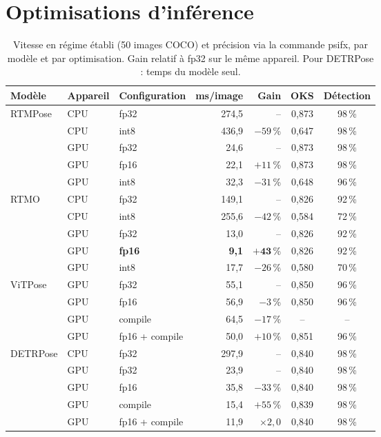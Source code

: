 \documentclass[11pt,a4paper]{report}
\begin{document}
\section{Optimisations d'inférence}
\label{sec:res-optim}

\begin{table}[H]
\centering
\caption{Vitesse en régime établi (50 images COCO) et précision via la commande psifx, par modèle et par
optimisation. Gain relatif à fp32 sur le même appareil. Pour DETRPose : temps du modèle seul.}
\label{tab:optim}
\small
\begin{tabular}{@{}lllrrcc@{}}
\toprule
Modèle & Appareil & Configuration & ms/image & Gain & OKS & Détection \\
\midrule
\multirow{5}{*}{RTMPose} & CPU & fp32 & 274,5 & -- & 0,873 & 98\,\% \\
& CPU & int8 & 436,9 & $-59$\,\% & 0,647 & 98\,\% \\
& GPU & fp32 & 24,6 & -- & 0,873 & 98\,\% \\
& GPU & fp16 & 22,1 & $+11$\,\% & 0,873 & 98\,\% \\
& GPU & int8 & 32,3 & $-31$\,\% & 0,648 & 96\,\% \\
\midrule
\multirow{5}{*}{RTMO} & CPU & fp32 & 149,1 & -- & 0,826 & 92\,\% \\
& CPU & int8 & 255,6 & $-42$\,\% & 0,584 & 72\,\% \\
& GPU & fp32 & 13,0 & -- & 0,826 & 92\,\% \\
& GPU & \textbf{fp16} & \textbf{9,1} & $\mathbf{+43}$\,\% & 0,826 & 92\,\% \\
& GPU & int8 & 17,7 & $-26$\,\% & 0,580 & 70\,\% \\
\midrule
\multirow{4}{*}{ViTPose} & GPU & fp32 & 55,1 & -- & 0,850 & 96\,\% \\
& GPU & fp16 & 56,9 & $-3$\,\% & 0,850 & 96\,\% \\
& GPU & compile & 64,5 & $-17$\,\% & -- & -- \\
& GPU & fp16 + compile & 50,0 & $+10$\,\% & 0,851 & 96\,\% \\
\midrule
\multirow{5}{*}{DETRPose} & CPU & fp32 & 297,9 & -- & 0,840 & 98\,\% \\
& GPU & fp32 & 23,9 & -- & 0,840 & 98\,\% \\
& GPU & fp16 & 35,8 & $-33$\,\% & 0,840 & 98\,\% \\
& GPU & compile & 15,4 & $+55$\,\% & 0,839 & 98\,\% \\
& GPU & fp16 + compile & 11,9 & $\times 2{,}0$ & 0,840 & 98\,\% \\
\bottomrule
\end{tabular}
\end{table}
\end{document}
